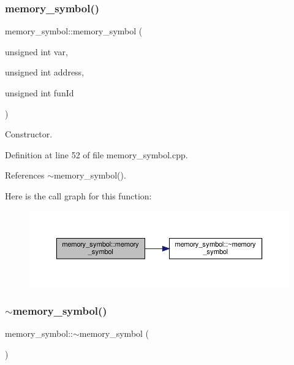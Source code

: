\subsubsection{\texorpdfstring{memory\+\_\+symbol()}{memory\_symbol()}}
{\footnotesize\ttfamily memory\+\_\+symbol\+::memory\+\_\+symbol (\begin{DoxyParamCaption}\item[{unsigned int}]{var,  }\item[{unsigned int}]{address,  }\item[{unsigned int}]{fun\+Id }\end{DoxyParamCaption})}



Constructor. 



Definition at line 52 of file memory\+\_\+symbol.\+cpp.



References $\sim$memory\+\_\+symbol().

Here is the call graph for this function\+:
\nopagebreak
\begin{figure}[H]
\begin{center}
\leavevmode
\includegraphics[width=350pt]{db/d51/classmemory__symbol_af5aff6a6fc83b0d8db9b26c91c2f8784_cgraph}
\end{center}
\end{figure}
\mbox{\label{classmemory__symbol_a28f05edf5ec3bea7bb70972dd4fbd265}} 
\subsubsection{\texorpdfstring{$\sim$memory\+\_\+symbol()}{~memory\_symbol()}}
{\footnotesize\ttfamily memory\+\_\+symbol\+::$\sim$memory\+\_\+symbol (\begin{DoxyParamCaption}{ }\end{DoxyParamCaption})\hspace{0.3cm}{\ttfamily [default]}}



